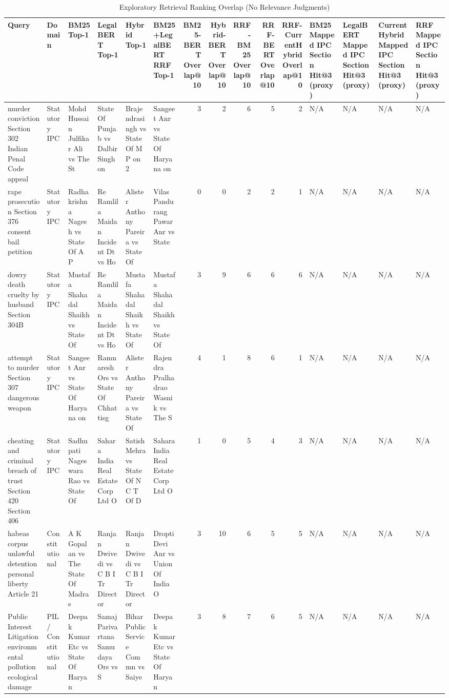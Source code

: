 \begin{table}
\caption{Exploratory Retrieval Ranking Overlap (No Relevance Judgments)}
\label{tab:retrieval_benchmark}
\begin{tabular}{llllllrrrrrllll}
\toprule
Query & Domain & BM25 Top-1 & LegalBERT Top-1 & Hybrid Top-1 & BM25+LegalBERT RRF Top-1 & BM25-BERT Overlap@10 & Hybrid-BERT Overlap@10 & RRF-BM25 Overlap@10 & RRF-BERT Overlap@10 & RRF-CurrentHybrid Overlap@10 & BM25 Mapped IPC Section Hit@3 (proxy) & LegalBERT Mapped IPC Section Hit@3 (proxy) & CurrentHybrid Mapped IPC Section Hit@3 (proxy) & RRF Mapped IPC Section Hit@3 (proxy) \\
\midrule
murder conviction Section 302 Indian Penal Code appeal & Statutory IPC & Mohd Hussain Julfikar Ali vs The St & State Of Punjab vs Dalbir Singh on  & Brajendrasingh vs State Of M P on 2 & Sangeet Anr vs State Of Haryana on  & 3 & 2 & 6 & 5 & 2 & N/A & N/A & N/A & N/A \\
rape prosecution Section 376 consent bail petition & Statutory IPC & Radhakrishna Nagesh vs State Of A P & Re Ramlila Maidan Incident Dt vs Ho & Alister Anthony Pareira vs State Of & Vilas Pandurang Pawar Anr vs State  & 0 & 0 & 2 & 2 & 1 & N/A & N/A & N/A & N/A \\
dowry death cruelty by husband Section 304B & Statutory IPC & Mustafa Shahadal Shaikh vs State Of & Re Ramlila Maidan Incident Dt vs Ho & Mustafa Shahadal Shaikh vs State Of & Mustafa Shahadal Shaikh vs State Of & 3 & 9 & 6 & 6 & 6 & N/A & N/A & N/A & N/A \\
attempt to murder Section 307 dangerous weapon & Statutory IPC & Sangeet Anr vs State Of Haryana on  & Ramnaresh Ors vs State Of Chhattisg & Alister Anthony Pareira vs State Of & Rajendra Pralhadrao Wasnik vs The S & 4 & 1 & 8 & 6 & 1 & N/A & N/A & N/A & N/A \\
cheating and criminal breach of trust Section 420 Section 406 & Statutory IPC & Sadhupati Nageswara Rao vs State Of & Sahara India Real Estate Corp Ltd O & Satish Mehra vs State Of N C T Of D & Sahara India Real Estate Corp Ltd O & 1 & 0 & 5 & 4 & 3 & N/A & N/A & N/A & N/A \\
habeas corpus unlawful detention personal liberty Article 21 & Constitutional & A K Gopalan vs The State Of Madras  & Ranjan Dwivedi vs C B I Tr Director & Ranjan Dwivedi vs C B I Tr Director & Dropti Devi Anr vs Union Of India O & 3 & 10 & 6 & 5 & 5 & N/A & N/A & N/A & N/A \\
Public Interest Litigation environmental pollution ecological damage & PIL / Constitutional & Deepak Kumar Etc vs State Of Haryan & Samaj Parivartana Samudaya Ors vs S & Bihar Public Service Commn vs Saiye & Deepak Kumar Etc vs State Of Haryan & 3 & 8 & 7 & 6 & 5 & N/A & N/A & N/A & N/A \\

\end{tabular}
\end{table}
